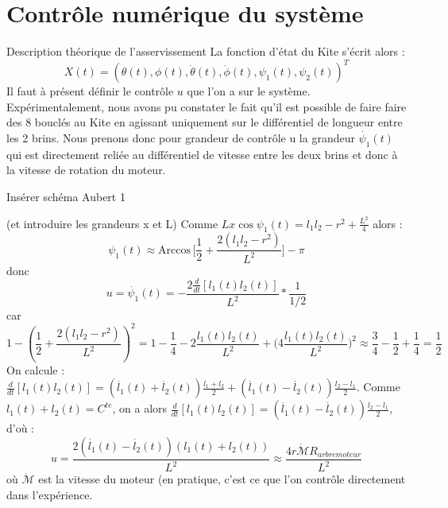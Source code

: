\documentclass[a4paper,twoside,12pt]{article}
\newcounter{partie}
\newcounter{sous-partie}
\newenvironment{partie}[1]
{
\section{#1}
}
{

}
\newenvironment{sous-partie}[1]
{
\subsection{#1}
}
{

}
\renewcommand{\arccos}{\mathrm{Arccos}\,}
\begin{document}
\begin{partie}{Contrôle numérique du système}
\begin{sous-partie}{Description théorique de l'asservissement}
\newline
La fonction d'état du Kite s'écrit alors :
$$X(t)=(\theta(t),\phi(t),\dot{\theta}(t),\dot{\phi}(t),\psi_1(t), \psi_2(t))^T$$
Il faut à présent définir le contrôle $u$ que l'on a sur le système. Expérimentalement, nous avons pu constater le fait qu'il est possible de faire faire des 8 bouclés au Kite en agissant uniquement sur le différentiel de longueur entre les 2 brins. Nous prenons donc pour grandeur de contrôle u la grandeur $\dot{\psi_1}(t)$ qui est directement reliée au différentiel de vitesse entre les deux brins et donc à la vitesse de rotation du moteur.
\newline
\begin{huge}
Insérer schéma Aubert 1 
\end{huge}
(et introduire les grandeurs x et L)
\newline
Comme $L x \cos \psi_1(t) = l_1 l_2 -r^2 +\frac{L^2}{4}$ alors : $$\psi_1(t) \approx \arccos \big[\frac{1}{2} + \frac{2(l_1 l_2-r^2)}{L^2}\big]-\pi$$ donc
$$u = \dot{\psi_1}(t)= -\frac{2\frac{d}{dt}[l_1(t) l_2(t)]}{L^2}* \frac{1}{1/2}$$ car $$1-(\frac{1}{2} + \frac{2(l_1 l_2-r^2)}{L^2})^2 = 1-\frac{1}{4} - 2 \frac{l_1(t)l_2(t)}{L^2} + \big(4 \frac{l_1(t)l_2(t)}{L^2}\big)^2 \approx \frac{3}{4}-\frac{1}{2} + \frac{1}{4}= \frac{1}{2}$$
On calcule : $\frac{d}{dt}[l_1(t) l_2(t)] = (\dot{l_1}(t)+ \dot{l_2}(t))\frac{l_1 + l_2}{2}+(\dot{l_1}(t)- \dot{l_2}(t))\frac{l_2 - l_1}{2}$. Comme $l_1(t)+l_2(t)=C^{te}$, on a alors $\frac{d}{dt}[l_1(t) l_2(t)]= (\dot{l_1}(t)- \dot{l_2}(t))\frac{l_2 - l_1}{2}$, d'où :
$$u =  \frac{2 (\dot{l_1}(t)-\dot{l_2}(t))(l_1(t)+l_2(t))}{L^2} \approx \frac{4 r \dot{\mathcal{M}} R_{arbre moteur}}{L^2}$$ où $\dot{\mathcal{M}}$ est la vitesse du moteur (en pratique, c'est ce que l'on contrôle directement dans l'expérience.




\end{sous-partie}
\end{partie}
\end{document}
